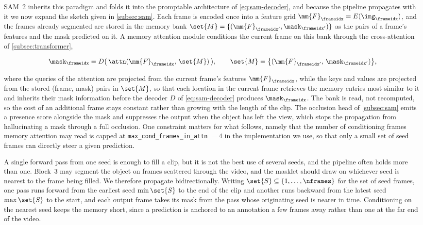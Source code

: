 SAM~2 \cite{ravi2024sam2} inherits this paradigm and folds it into the promptable
architecture of \cref{eq:sam-decoder}, and because the pipeline propagates with it we now
expand the sketch given in \cref{subsec:sam}. Each frame is encoded once into a feature
grid $\mm{F}_\frameidx = E(\img_\frameidx)$, and the frames already segmented are stored
in the memory bank $\set{M} = \{(\mm{F}_{\frameidx'}, \mask_{\frameidx'})\}$ as the pairs
of a frame's features and the mask predicted on it. A memory attention module conditions
the current frame on this bank through the cross-attention of \cref{subsec:transformer},

\begin{equation}
  \mask_\frameidx = D\big(\, \attn(\mm{F}_\frameidx,\, \set{M}) \,\big),
  \qquad
  \set{M} = \big\{ (\mm{F}_{\frameidx'},\, \mask_{\frameidx'}) \big\},
  \label{eq:mem-attn}
\end{equation}

where the queries of the attention are projected from the current frame's features
$\mm{F}_\frameidx$, while the keys and values are projected from the stored
(frame, mask) pairs in $\set{M}$, so that each location in the current frame retrieves the
memory entries most similar to it and inherits their mask information before the decoder
$D$ of \cref{eq:sam-decoder} produces $\mask_\frameidx$. The bank is read, not recomputed,
so the cost of an additional frame stays constant rather than growing with the length of
the clip. The occlusion head of \cref{subsec:sam} emits a presence score alongside the
mask and suppresses the output when the object has left the view, which stops the
propagation from hallucinating a mask through a full occlusion. One constraint matters for
what follows, namely that the number of conditioning frames memory attention may read is
capped at \texttt{max\_cond\_frames\_in\_attn} $=4$ in the implementation we use, so that
only a small set of seed frames can directly steer a given prediction.

A single forward pass from one seed is enough to fill a clip, but it is not the best use
of several seeds, and the pipeline often holds more than one. Block~3 may segment the
object on frames scattered through the video, and the masklet should draw on whichever
seed is nearest to the frame being filled. We therefore propagate bidirectionally.
Writing $\set{S} \subseteq \{1, \dots, \nframes\}$ for the set of seed frames, one pass
runs forward from the earliest seed $\min \set{S}$ to the end of the clip and another runs
backward from the latest seed $\max \set{S}$ to the start, and each output frame takes its
mask from the pass whose originating seed is nearer in time. Conditioning on the nearest
seed keeps the memory short, since a prediction is anchored to an annotation a few frames
away rather than one at the far end of the video.

